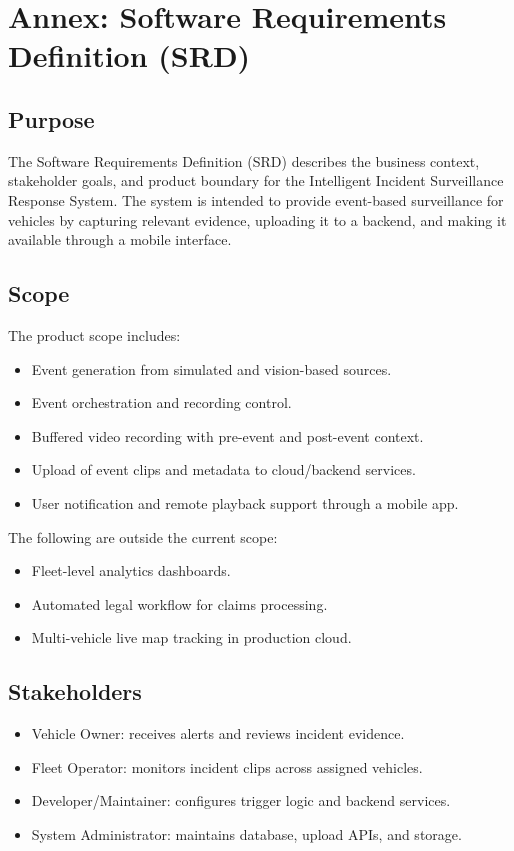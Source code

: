 \chapter{Annex: Software Requirements Definition (SRD)}
\section{Purpose}
The Software Requirements Definition (SRD) describes the business context, stakeholder goals, and product boundary for the Intelligent Incident Surveillance Response System. The system is intended to provide event-based surveillance for vehicles by capturing relevant evidence, uploading it to a backend, and making it available through a mobile interface.

\section{Scope}
The product scope includes:
\begin{itemize}
\item Event generation from simulated and vision-based sources.
\item Event orchestration and recording control.
\item Buffered video recording with pre-event and post-event context.
\item Upload of event clips and metadata to cloud/backend services.
\item User notification and remote playback support through a mobile app.
\end{itemize}

The following are outside the current scope:
\begin{itemize}
\item Fleet-level analytics dashboards.
\item Automated legal workflow for claims processing.
\item Multi-vehicle live map tracking in production cloud.
\end{itemize}

\section{Stakeholders}
\begin{itemize}
\item Vehicle Owner: receives alerts and reviews incident evidence.
\item Fleet Operator: monitors incident clips across assigned vehicles.
\item Developer/Maintainer: configures trigger logic and backend services.
\item System Administrator: maintains database, upload APIs, and storage.
\end{itemize}

